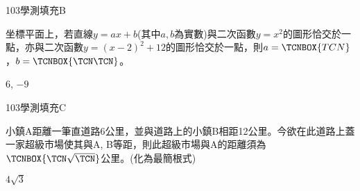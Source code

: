     \begin{QUESTION}
        \begin{ExamInfo}{103}{學測}{填充}{B}
        \end{ExamInfo}
        \begin{ExamAnsRateInfo}{15}{42}{3}{0}
        \end{ExamAnsRateInfo}
        \begin{QBODY}
            坐標平面上，若直線$y=ax+b$(其中$a,b$為實數)與二次函數$y={{x}^{2}}$的圖形恰交於一點，亦與二次函數$y={{(x-2)}^{2}}+12$的圖形恰交於一點，則$a=\TCNBOX{TCN}$，$b=\TCNBOX{\TCN\TCN}$。
        \end{QBODY}
        \begin{QFROMS}
        \end{QFROMS}
        \begin{QTAGS}\end{QTAGS}
        \begin{QANS}
            $6$, $-9$
        \end{QANS}
        \begin{QSOLLIST}
        \end{QSOLLIST}
        \begin{QEMPTYSPACE}
        \end{QEMPTYSPACE}
    \end{QUESTION}
    \begin{QUESTION}
        \begin{ExamInfo}{103}{學測}{填充}{C}
        \end{ExamInfo}
        \begin{ExamAnsRateInfo}{49}{87}{53}{7}
        \end{ExamAnsRateInfo}
        \begin{QBODY}
            小鎮A距離一筆直道路6公里，並與道路上的小鎮B相距12公里。今欲在此道路上蓋一家超級市場使其與A, B等距，則此超級市場與A的距離須為$\TCNBOX{\TCN\sqrt{\TCN}}$公里。(化為最簡根式)
        \end{QBODY}
        \begin{QFROMS}
        \end{QFROMS}
        \begin{QTAGS}\end{QTAGS}
        \begin{QANS}
            $4\sqrt{3}$
        \end{QANS}
        \begin{QSOLLIST}
        \end{QSOLLIST}
        \begin{QEMPTYSPACE}
        \end{QEMPTYSPACE}
    \end{QUESTION}
